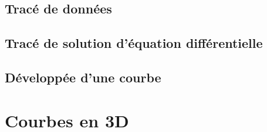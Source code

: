  \subsection{Tracé de données}
 \subsection{Tracé de solution d’équation différentielle}
 \subsection{Développée d’une courbe}
 \section{Courbes en 3D}   
  
